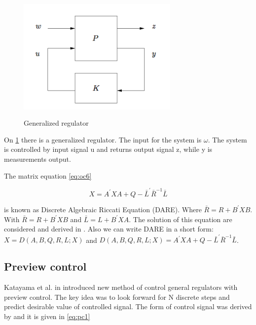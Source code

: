 \documentclass[12pt,a4paper]{report}
\begin{document}
			\begin{figure}[h!]
				\vspace{-0.2cm}
				\centering
				{\includegraphics[width=0.7\textwidth]{11}}
				\caption{Generalized regulator \cite{hazell2008discrete}}
				\label{fig:11}
				\vspace{-0.1cm}
			\end{figure}
			
			On \cref{fig:11} there is a generalized regulator. The input for the system is $\omega$. The system is controlled by input signal u and returns output signal z, while y is measurements output.
			
			The matrix equation \ref{eq:oc6}
			
			\begin{equation}\label{eq:oc6}
				X = A^{'}XA + Q - \bar{L}^{'} \bar{R}^{-1} \bar{L}
			\end{equation}
			
			is known as Discrete Algebraic Riccati Equation (DARE). Where $\bar{R} = R + B^{'}XB$. With $\bar{R} = R + B^{'}XB$ and $\bar{L} = L + B^{'}XA$. The solution of this equation are considered and derived in \cite{hazell2008discrete}. Also we can write DARE in a short form: $X = D(A,B,Q,R,L;X)$ and $D(A,B,Q,R,L;X) = A^{'} XA + Q -  \bar{L}^{'} \bar{R}^{-1} \bar{L}$.
		
		\subsection{Preview control} 
			Katayama et al. in \cite{katayama1985design} introduced new method of control general regulators with preview control. The key idea was to look forward for N discrete steps and predict desirable value of controlled signal. The form of control signal was derived by \cite{katayama1985design} and it is given in \ref{eq:pc1}
			
\end{document}
